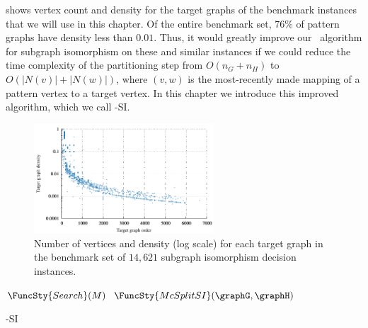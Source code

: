  shows vertex count and density for the target graphs of the benchmark instances
that we will use in this chapter.  Of the entire benchmark set, $76\%$ of pattern graphs have density less than $0.01$.  Thus, it would
greatly improve our \McSplit\ algorithm for subgraph isomorphism on these and similar instances if we could reduce the time complexity of the partitioning
step from $O(n_G + n_H)$ to $O(|N(v)| + |N(w)|)$, where $(v,w)$ is the most-recently made mapping of a pattern vertex to a target
vertex.  In this chapter we introduce this improved algorithm, which we call \McSplit-SI.

\begin{figure}[h!]
    \centering
    \includegraphics*[width=0.6\textwidth]{14b-mcsplit-induced-si/density-chart/plots/n-density-pdf}
    \caption{Number of vertices and density (log scale) for each target graph in the benchmark set
    of $14,621$ subgraph isomorphism decision instances.}
    \label{figure:si-targets-n-density}
\end{figure}

\FloatBarrier

\begin{algorithm}[h!]
\DontPrintSemicolon
\nl $\FuncSty{Search}(M)$ \;
\nl {}
\;
\nl $\FuncSty{McSplitSI}(\graphG,\graphH)$ \label{DecisionMcSplitFun} \;
\nl {}
\caption{\McSplit-SI}
\label{McSplitSIAlg}
\end{algorithm}


